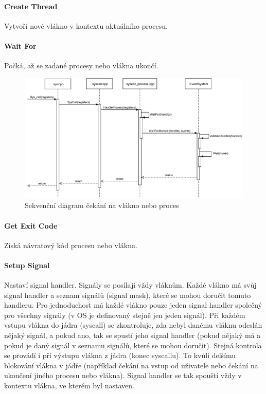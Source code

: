 \documentclass[11pt,a4paper]{scrartcl}
\begin{document}
	\paragraph{Create Thread}
	Vytvoří nové vlákno v kontextu aktuálního procesu.
	
	\paragraph{Wait For}
	Počká, až se zadané procesy nebo vlákna ukončí.
	
	\begin{figure}[H]
		\centering
		\includegraphics[width=14cm]{wait-for-proc.pdf}
		\caption{Sekvenční diagram čekání na vlákno nebo proces}
		\label{fig:wait-for-proc}
	\end{figure}
	
	\paragraph{Get Exit Code}
	Získá návratový kód procesu nebo vlákna.
	
	\paragraph{Setup Signal}
	Nastaví signal handler. Signály se posílají vždy vláknům. Každé vlákno má svůj signal handler a seznam signálů (signal mask), které se mohou doručit tomuto handleru. Pro jednoduchost má každé vlákno pouze jeden signal handler společný pro všechny signály (v OS je definovaný stejně jen jeden signál). Při každém vstupu vlákna do jádra (syscall) se zkontroluje, zda nebyl danému vláknu odeslán nějaký signál, a pokud ano, tak se spustí jeho signal handler (pokud nějaký má a pokud je daný signál v seznamu signálů, které se mohou doručit). Stejná kontrola se provádí i při výstupu vlákna z jádra (konec syscallu). To kvůli delšímu blokování vlákna v jádře (například čekání na vstup od uživatele nebo čekání na ukončení jiného procesu nebo vlákna). Signal handler se tak spouští vždy v kontextu vlákna, ve kterém byl nastaven.
	
\end{document}
